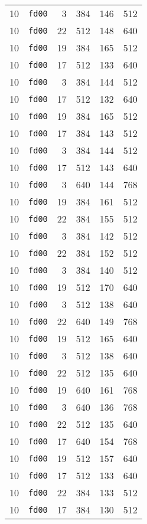 \documentclass{article}
\begin{document}
\begin{table}[h!]
\begin{tabular}{llrrrl}
    10 & \texttt{fd00} & 3 & 384 & 146 & 512 \\
    10 & \texttt{fd00} & 22 & 512 & 148 & 640 \\
    10 & \texttt{fd00} & 19 & 384 & 165 & 512 \\
    10 & \texttt{fd00} & 17 & 512 & 133 & 640 \\
    10 & \texttt{fd00} & 3 & 384 & 144 & 512 \\
    10 & \texttt{fd00} & 17 & 512 & 132 & 640 \\
    10 & \texttt{fd00} & 19 & 384 & 165 & 512 \\
    10 & \texttt{fd00} & 17 & 384 & 143 & 512 \\
    10 & \texttt{fd00} & 3 & 384 & 144 & 512 \\
    10 & \texttt{fd00} & 17 & 512 & 143 & 640 \\
    10 & \texttt{fd00} & 3 & 640 & 144 & 768 \\
    10 & \texttt{fd00} & 19 & 384 & 161 & 512 \\
    10 & \texttt{fd00} & 22 & 384 & 155 & 512 \\
    10 & \texttt{fd00} & 3 & 384 & 142 & 512 \\
    10 & \texttt{fd00} & 22 & 384 & 152 & 512 \\
    10 & \texttt{fd00} & 3 & 384 & 140 & 512 \\
    10 & \texttt{fd00} & 19 & 512 & 170 & 640 \\
    10 & \texttt{fd00} & 3 & 512 & 138 & 640 \\
    10 & \texttt{fd00} & 22 & 640 & 149 & 768 \\
    10 & \texttt{fd00} & 19 & 512 & 165 & 640 \\
    10 & \texttt{fd00} & 3 & 512 & 138 & 640 \\
    10 & \texttt{fd00} & 22 & 512 & 135 & 640 \\
    10 & \texttt{fd00} & 19 & 640 & 161 & 768 \\
    10 & \texttt{fd00} & 3 & 640 & 136 & 768 \\
    10 & \texttt{fd00} & 22 & 512 & 135 & 640 \\
    10 & \texttt{fd00} & 17 & 640 & 154 & 768 \\
    10 & \texttt{fd00} & 19 & 512 & 157 & 640 \\
    10 & \texttt{fd00} & 17 & 512 & 133 & 640 \\
    10 & \texttt{fd00} & 22 & 384 & 133 & 512 \\
    10 & \texttt{fd00} & 17 & 384 & 130 & 512 \\

\end{tabular}
\end{table}
\end{document}
